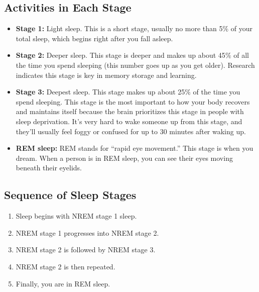 \subsection{Activities in Each Stage}
\begin{itemize}
    \item \textbf{Stage 1:} Light sleep. This is a short stage, usually no more than 5$\%$ of your total sleep, which begins right after you fall asleep.
    \item \textbf{Stage 2:} Deeper sleep. This stage is deeper and makes up about 45$\%$ of all the time you spend sleeping (this number goes up as you get older). Research indicates this stage is key in memory storage and learning.
    \item \textbf{Stage 3:} Deepest sleep. This stage makes up about 25$\%$ of the time you spend sleeping. This stage is the most important to how your body recovers and maintains itself because the brain prioritizes this stage in people with sleep deprivation. It’s very hard to wake someone up from this stage, and they’ll usually feel foggy or confused for up to 30 minutes after waking up.
    \item \textbf{REM sleep:} REM stands for “rapid eye movement.” This stage is when you dream. When a person is in REM sleep, you can see their eyes moving beneath their eyelids.
\end{itemize}

\subsection{Sequence of Sleep Stages}
\begin{enumerate}
    \item Sleep begins with NREM stage 1 sleep.
    \item NREM stage 1 progresses into NREM stage 2.
    \item NREM stage 2 is followed by NREM stage 3.
    \item NREM stage 2 is then repeated.
    \item Finally, you are in REM sleep.\cite{sequence}
\end{enumerate}